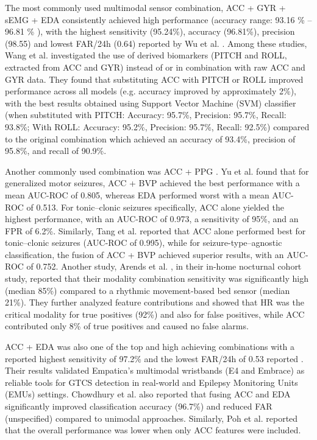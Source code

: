 The most commonly used multimodal sensor combination, ACC + GYR + sEMG + EDA \cite{Wang2025-ql,Ge2023-ab,Li2022-ty,Wu2024-yl,Wang2022-lt} consistently achieved high performance  (accuracy range: 93.16 \% \cite{Ge2023-ab} -- 96.81 \% \cite{Wu2024-yl}), with the highest sensitivity (95.24\%), accuracy (96.81\%), precision (98.55) and lowest FAR/24h (0.64) reported by Wu et al.  \cite{Wu2024-yl}. Among these studies, Wang et al. \cite{Wang2025-ql} investigated the use of derived biomarkers (PITCH and ROLL, extracted from ACC and GYR) instead of or in combination with raw ACC and GYR data. They found that substituting ACC with PITCH or ROLL improved performance across all models  (e.g. accuracy improved by approximately 2\%), with the best results obtained using Support Vector Machine (SVM) classifier  (when substituted with PITCH: Accuracy: 95.7\%, Precision: 95.7\%, Recall: 93.8\%; With ROLL: Accuracy: 95.2\%, Precision: 95.7\%, Recall: 92.5\%) compared to the original combination which achieved an accuracy of 93.4\%, precision of 95.8\%, and recall of 90.9\%.

Another commonly used combination was ACC + PPG \cite{Ali2020-ke,Tang2021-td,Arends2018-ew,Yu2023-ss}. Yu et al. \cite{Yu2023-ss} found that for generalized motor seizures, ACC + BVP achieved the best performance with a mean AUC-ROC of 0.805, whereas EDA performed worst with a mean AUC-ROC of 0.513. For tonic–clonic seizures specifically, ACC alone yielded the highest performance, with an AUC-ROC of 0.973, a sensitivity of 95\%, and an FPR of 6.2\%. Similarly, Tang et al. \cite{Tang2021-td} reported that ACC alone performed best for tonic–clonic seizures (AUC-ROC of 0.995), while for seizure-type–agnostic classification, the fusion of ACC + BVP achieved superior results, with an AUC-ROC of 0.752.  Another study, Arends et al.  \cite{Arends2018-ew}, in their in-home nocturnal cohort study, reported that their modality combination sensitivity was significantly high (median 85\%) compared to a rhythmic movement-based bed sensor (median 21\%). They further analyzed feature contributions and showed that HR was the critical modality for true positives (92\%) and also for false positives, while ACC contributed only 8\% of true positives and caused no false alarms.

ACC + EDA was also one of the top and high achieving combinations \cite{Regalia2019-ch,Chowdhury2022-bi,Poh2012-af} with a reported highest sensitivity of 97.2\% \cite{Chowdhury2022-bi} and the lowest FAR/24h of 0.53 reported \cite{Regalia2019-ch}. Their results validated Empatica’s multimodal wristbands (E4 and Embrace) as reliable tools for GTCS detection in real-world and Epilepsy Monitoring Units (EMUs) settings. Chowdhury et al. \cite{Chowdhury2022-bi} also reported that fusing ACC and EDA significantly improved classification accuracy (96.7\%) and reduced FAR (unspecified) compared to unimodal approaches. Similarly, Poh et al. \cite{De_Cooman2018-pq} reported that the overall performance was lower when   only ACC features were included.


